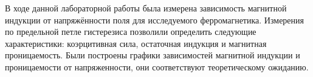 В ходе данной лабораторной работы была измерена зависимость магнитной индукции от напряжённости поля для исследуемого ферромагнетика. Измерения по предельной петле гистерезиса позволили определить следующие характеристики: коэрцитивная сила, остаточная индукция и магнитная проницаемость. Были построены графики зависимостей магнитной индукции и проницаемости от напряженности, они соответствуют теоретическому ожиданию.